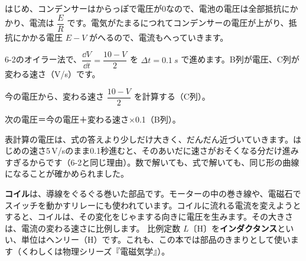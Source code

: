 はじめ、コンデンサーはからっぽで電圧が0なので、電池の電圧は全部抵抗にかかり、電流は $\dfrac{E}{R}$ です。電気がたまるにつれてコンデンサーの電圧が上がり、抵抗にかかる電圧 $E-V$ がへるので、電流もへっていきます。

6-2のオイラー法で、$\dfrac{\dd V}{\dd t}=\dfrac{10-V}{2}$ を $\Delta t=\qty{0.1}{s}$ で進めます。B列が電圧、C列が変わる速さ（V/s）です。
\begin{enumerate}[label={\bkcircled[\bkTF]{\arabic*}}, leftmargin=2.4\zw, itemsep=1pt, topsep=2pt]
\item 今の電圧から、変わる速さ $\dfrac{10-V}{2}$ を計算する（C列）。
\item 次の電圧＝今の電圧＋変わる速さ×0.1（B列）。
\end{enumerate}
\begin{bkcenter}
\end{bkcenter}
表計算の電圧は、式の答えより少しだけ大きく、だんだん近づいていきます。はじめの速さ5\,V/sのまま0.1秒進むと、そのあいだに速さがおそくなる分だけ進みすぎるからです（6-2と同じ理由）。数で解いても、式で解いても、同じ形の曲線になることが確かめられました。

\label{bk:6-4:rl}\textbf{コイル}は、導線をぐるぐる巻いた部品です。モーターの中の巻き線や、電磁石でスイッチを動かすリレーにも使われています。コイルに流れる電流を変えようとすると、コイルは、その変化をじゃまする向きに電圧を生みます。その大きさは、電流の変わる速さに比例します。
比例定数 $L$〔H〕を\textbf{インダクタンス}といい、単位はヘンリー（H）です。これも、この本では部品のきまりとして使います（くわしくは物理シリーズ『電磁気学』）。

